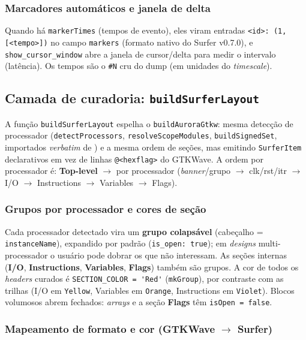 \subsubsection{Marcadores automáticos e janela de delta}

Quando há \lstinline|markerTimes| (tempos de evento), eles viram entradas
\lstinline|<id>: (1, [<tempo>])| no campo \lstinline|markers| (formato nativo do
Surfer v0.7.0), e \lstinline|show_cursor_window| abre a janela de cursor/delta para
medir o intervalo (latência). Os tempos são o \lstinline|#N| cru do dump (em
unidades do \emph{timescale}).

\subsection{Camada de curadoria: \lstinline|buildSurferLayout|}
\label{sec:cap10-surfer-curadoria}

A função \lstinline|buildSurferLayout| espelha o \lstinline|buildAuroraGtkw|:
mesma detecção de processador (\lstinline|detectProcessors|,
\lstinline|resolveScopeModules|, \lstinline|buildSignedSet|, importados \emph{verbatim}
de ) e a mesma ordem de seções, mas emitindo
\lstinline|SurferItem| declarativos em vez de linhas \lstinline|@<hexflag>| do
GTKWave. A ordem por processador é: \textbf{Top-level} $\rightarrow$ por processador
(\emph{banner}/grupo $\rightarrow$ clk/rst/itr $\rightarrow$ I/O $\rightarrow$
Instructions $\rightarrow$ Variables $\rightarrow$ Flags).

\subsubsection{Grupos por processador e cores de seção}

Cada processador detectado vira um \textbf{grupo colapsável} (cabeçalho =
\lstinline|instanceName|), expandido por padrão (\lstinline|is_open: true|); em
\emph{designs} multi-processador o usuário pode dobrar os que não interessam. As
seções internas (\textbf{I/O}, \textbf{Instructions}, \textbf{Variables},
\textbf{Flags}) também são grupos. A cor de todos os \emph{headers} curados é
\lstinline|SECTION_COLOR = 'Red'| (\lstinline|mkGroup|), por contraste com as
trilhas (I/O em \lstinline|Yellow|, Variables em \lstinline|Orange|, Instructions em
\lstinline|Violet|). Blocos volumosos abrem fechados: \emph{arrays} e a seção
\textbf{Flags} têm \lstinline|isOpen = false|.

\subsubsection{Mapeamento de formato e cor (GTKWave $\rightarrow$ Surfer)}

